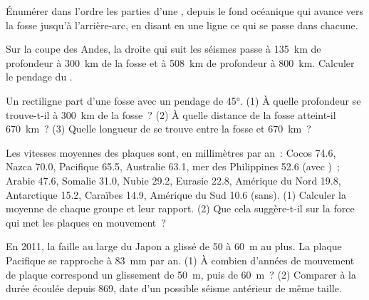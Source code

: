 \begin{exercise}[$\star$]\label{exo:g11:subduction-zones:5}
Énumérer dans l'ordre les parties d'une , depuis le fond
océanique qui avance vers la fosse jusqu'à l'arrière-arc, en disant en une
ligne ce qui se passe dans chacune.
\end{exercise}

\begin{exercise}[$\star\star$]\label{exo:g11:subduction-zones:6}
Sur la coupe des Andes, la droite qui suit les séismes passe à
\qty{135}{km} de profondeur à \qty{300}{km} de la fosse et à
\qty{508}{km} de profondeur à \qty{800}{km}. Calculer le pendage du .
\end{exercise}

\begin{exercise}[$\star\star$]\label{exo:g11:subduction-zones:7}
Un  rectiligne part d'une fosse avec un pendage de
\ang{45}. (1) À quelle profondeur se trouve-t-il à \qty{300}{km} de la
fosse~? (2) À quelle distance de la fosse atteint-il \qty{670}{km}~?
(3) Quelle longueur de  se trouve entre la fosse et \qty{670}{km}~?
\end{exercise}

\begin{exercise}[$\star\star$]\label{exo:g11:subduction-zones:8}
Les vitesses moyennes des plaques sont, en millimètres par an~: Cocos 74.6,
Nazca 70.0, Pacifique 65.5, Australie 63.1, mer des Philippines 52.6 (avec
)~; Arabie 47.6, Somalie 31.0, Nubie 29.2, Eurasie 22.8,
Amérique du Nord 19.8, Antarctique 15.2, Caraïbes 14.9, Amérique du Sud 10.6
(sans). (1) Calculer la moyenne de chaque groupe et leur rapport. (2) Que
cela suggère-t-il sur la force qui met les plaques en mouvement~?
\end{exercise}

\begin{exercise}[$\star\star$]\label{exo:g11:subduction-zones:9}
En 2011, la faille au large du Japon a glissé de 50 à \qty{60}{m} au plus.
La plaque Pacifique se rapproche à \qty{83}{mm} par an. (1) À combien
d'années de mouvement de plaque correspond un glissement de \qty{50}{m},
puis de \qty{60}{m}~? (2) Comparer à la durée écoulée depuis 869, date d'un
possible séisme antérieur de même taille.
\end{exercise}

